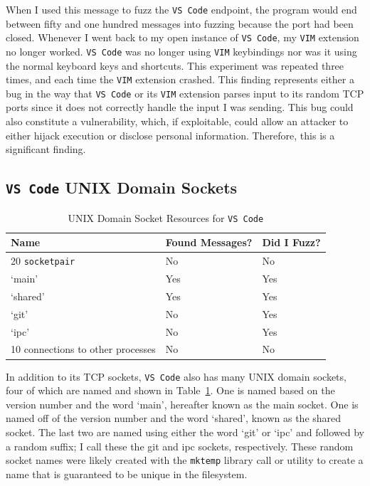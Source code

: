When I used this message to fuzz the \texttt{VS Code} endpoint, the program would end between fifty and one hundred messages into fuzzing because the port had been closed.  Whenever I went back to my open instance of \texttt{VS Code}, my \texttt{VIM} extension no longer worked.  \texttt{VS Code} was no longer using \texttt{VIM} keybindings nor was it using the normal keyboard keys and shortcuts.  This experiment was repeated three times, and each time the \texttt{VIM} extension crashed.  This finding represents either a bug in the way that \texttt{VS Code} or its \texttt{VIM} extension parses input to its random TCP ports since it does not correctly handle the input I was sending.  This bug could also constitute a vulnerability, which, if exploitable, could allow an attacker to either hijack execution or disclose personal information.  Therefore, this is a significant finding.

\subsection{\texttt{VS Code} UNIX Domain Sockets}
\label{sec:codeUnix}

\begin{table}
\centering
\begin{normalsize}
\begin{tabular}{ l | l | l }
\textbf{Name} & \textbf{Found Messages?} & \textbf{Did I Fuzz?} \\ \hline
20 \texttt{socketpair} & No & No \\ \hline
`main' & Yes & Yes \\ \hline
`shared' & Yes & Yes \\ \hline
`git' & No & Yes \\ \hline
`ipc' & No & Yes \\ \hline
10 connections to other processes & No & No \\ \hline
\end{tabular}
\caption{UNIX Domain Socket Resources for \texttt{VS Code}}
\label{tab:vsCodeUnixTab}
\end{normalsize}
\end{table} 

In addition to its TCP sockets, \texttt{VS Code} also has many UNIX domain sockets,  four of which are named and shown in Table~\ref{tab:vsCodeUnixTab}.  One is named based on the version number and the word `main', hereafter known as the main socket.  One is named off of the version number and the word `shared', known as the shared socket.  The last two are named using either the word `git' or `ipc' and followed by a random suffix; I call these the git and ipc sockets, respectively.  These random socket names were likely created with the \texttt{mktemp} library call or utility to create a name that is guaranteed to be unique in the filesystem.

